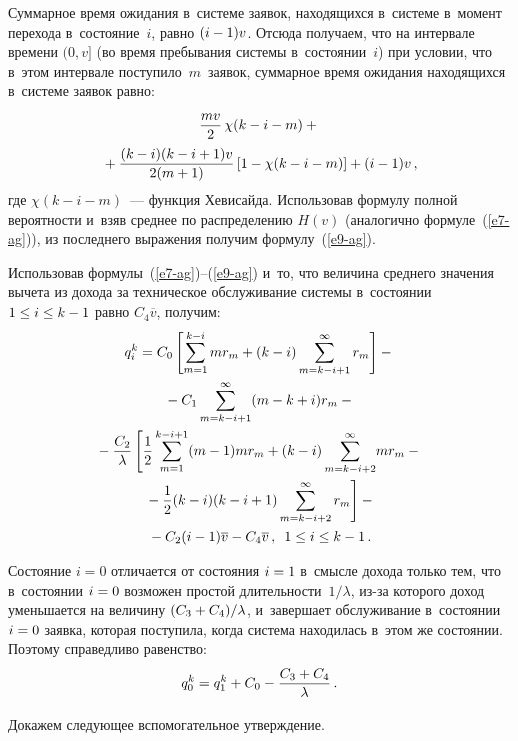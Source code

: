 \begin{multicols}{2}
  Суммарное время ожидания в~системе заявок, находящихся в~системе 
в~момент перехода в~состояние~$i$, равно $(i\hm- 1)v$. Отсюда получаем, что 
на интервале времени $(0,v]$ (во время пребывания системы в~состоянии~$i$) 
при условии, что в~этом интервале поступило~$m$~заявок, суммарное время 
ожидания находящихся в~системе заявок равно:
  \begin{multline*}
  \displaystyle\frac{\displaystyle mv\mathstrut}{\displaystyle 2\mathstrut}\,\chi(k-i-m) +{}\\
  {}+\displaystyle\frac{\displaystyle (k-i)(k-i+1)v\mathstrut}{\displaystyle 2(m+1)\mathstrut}\left[ 1-\chi(k-i-m)\right] +(i-
1)v\,,
  \end{multline*}
где $\chi(k-i-m)$~--- функция Хевисайда. Использовав формулу полной 
вероятности и~взяв среднее по распределению $H(v)$ (аналогично 
формуле~(\ref{e7-ag})), из последнего выражения получим  
формулу~(\ref{e9-ag}).

  Использовав формулы~(\ref{e7-ag})--(\ref{e9-ag}) и~то, что величина 
среднего значения вычета из дохода за техническое обслуживание системы 
в~состоянии $1\hm\leq i\hm\leq k\hm-1$ равно $C_4\overline{v}$, получим:
  \begin{multline}
  q_i^k = C_0 \left[ \sum\limits_{m=1}^{k-i} mr_m +(k-i)\sum\limits^\infty_{m=k-
i+1} r_m \right] - {}\\
{}-C_1 \sum\limits^\infty_{m=k-i+1} (m-k+i) r_m-{}\\
  {}-\displaystyle\frac{\displaystyle C_2\mathstrut}{\displaystyle \lambda\mathstrut} \left[ \displaystyle\frac{\displaystyle 1\mathstrut}{\displaystyle 2\mathstrut}\sum\limits_{m=1}^{k-i+1} (m-1) mr_m 
+(k-i) \sum\limits_{m=k-i+2}^\infty \!mr_m -{}\right.\\
  \left.{}- \displaystyle\frac{\displaystyle 1\mathstrut}{\displaystyle 2\mathstrut}(k-i) (k-i+1) \sum\limits^\infty_{m=k-i+2} r_m\right] - {}\\
  {}-C_2(i-1) 
\overline{v} -C_4 \overline{v}\,,\enskip 1\leq i\leq k-1\,.
  \label{e10-ag}
  \end{multline}
  
  Состояние $i=0$ отличается от состояния $i\hm=1$ в~смысле дохода только 
тем, что в~состоянии $i\hm=0$ возможен простой длительности~$1/\lambda$, 
из-за которого доход уменьшается на величину $(C_3\hm+C_4)/\lambda$, 
и~завершает обслуживание в~состоянии $i\hm=0$ заявка, которая поступила, 
когда система находилась в~этом же состоянии. Поэтому справедливо равенство:
  \begin{equation*}
  q_0^k = q_1^k +C_0 - \displaystyle\frac{\displaystyle C_3+C_4\mathstrut}{\displaystyle \lambda\mathstrut}\,.
  \end{equation*}
  
  Докажем следующее вспомогательное утверждение.
  
  \smallskip
  

\end{multicols}
